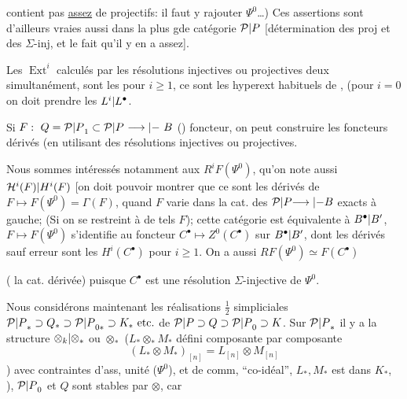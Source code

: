 contient pas \uline{assez} de \inserted{$\Sigma$-}projectifs: il faut y rajouter $\Psi^0$\ldots)  Ces assertions sont d'ailleurs vraies aussi dans la plus gde catégorie ${\mathcal P|P}$ [détermination des \inserted{$\Sigma$-}proj et des $\Sigma$-inj, et le fait qu'il y en a assez].

Les $\operatorname{Ext}^i$ calculés par les résolutions injectives  ou projectives    deux simultanément, sont les  pour $i\geq1$, ce sont les hyperext habituels de , (pour $i=0$ on doit prendre les ${L^i|L^\bullet}$.

Si $F:\ Q={\mathcal P|P}_1\subset {\mathcal P|P}\ {\longrightarrow|{-}}\ B$ ()  foncteur, on peut construire les foncteurs dérivés  (en utilisant des résolutions injectives ou projectives.

Nous sommes intéressés notamment aux $R^iF(\Psi^0)$, qu'on note aussi ${\mathcal H^i(F)|H^i(F)}$ [on doit pouvoir montrer que ce sont les dérivés  de $F\mapsto F(\Psi^0)=\Gamma(F)$, quand $F$ varie dans la cat. des   ${\mathcal P|P}{\longrightarrow|{-}}B$ \inserted{$\Sigma$-}exacts à gauche; (Si on se restreint à de tels $F$);  cette catégorie est équivalente à   ${B^\bullet|B'}$, $F\mapsto F(\Psi^0)$ s'identifie  au foncteur $C^\bullet\mapsto Z^0(C^\bullet)$ sur ${B^\bullet|B'}$, dont les dérivés sauf erreur sont les $H^i(C^\bullet)$ pour $i\geq1$. On a aussi $RF(\Psi^0)\simeq F(C^\bullet)$

( la cat. dérivée) puisque $C^\bullet$ est une résolution $\Sigma$-injective de $\Psi^0$.


Nous considérons maintenant les réalisations $\tfrac12$ simpliciales $\unsure{\mathcal P|P}_*\supset Q_*\supset \unsure{\mathcal P|P}_{0*}\supset K_*\ \unsure{\text{etc.}}$ de ${\mathcal P|P}\supset Q\supset {\mathcal P|P}_0\supset K$. Sur ${\mathcal P|P}_*$ il y a la structure ${\otimes_k|\otimes_*}$ ou $\otimes_*$
($L_*\otimes_*M_*$ défini composante par composante
\[
(L_*\otimes M_*)_{[n]}=L_{[n]}\otimes M_{[n]}
\]
)
avec contraintes d'ass, unité ($\Psi^0$), et de comm,     ``co-idéal'',   $L_*,M_*$ est dans $K_*$, ), ${\mathcal P|P}_0$ et $Q$ sont stables par $\otimes$, car

